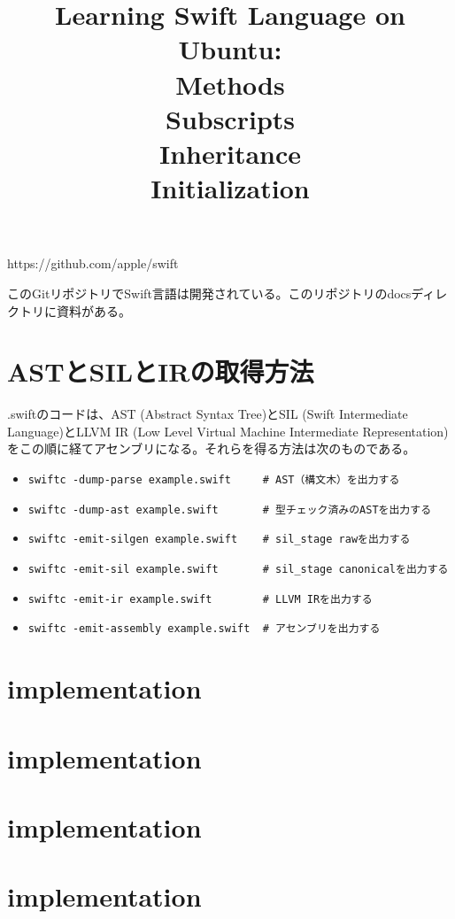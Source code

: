 \documentclass[uplatex,dvipdfmx]{jsarticle} \usepackage{amsmath,amssymb,bm}
\title{Learning Swift Language on Ubuntu:\\Methods\\Subscripts\\Inheritance\\Initialization} \author{} \date{}
\begin{document}
\maketitle


https://github.com/apple/swift

このGitリポジトリでSwift言語は開発されている。このリポジトリのdocsディレクトリに資料がある。

\section*{ASTとSILとIRの取得方法}
.swiftのコードは、AST (Abstract Syntax Tree)とSIL (Swift Intermediate Language)とLLVM IR (Low Level Virtual Machine Intermediate Representation)をこの順に経てアセンブリになる。それらを得る方法は次のものである。

\begin{itemize}
\item {\tt swiftc -dump-parse example.swift\ \ \ \ \ \# AST（構文木）を出力する}
\item {\tt swiftc -dump-ast example.swift\ \ \ \ \ \ \ \# 型チェック済みのASTを出力する}
\item {\tt swiftc -emit-silgen example.swift\ \ \ \ \# sil\_stage rawを出力する}
\item {\tt swiftc -emit-sil example.swift\ \ \ \ \ \ \ \# sil\_stage canonicalを出力する}
\item {\tt swiftc -emit-ir example.swift\ \ \ \ \ \ \ \ \# LLVM IRを出力する}
\item {\tt swiftc -emit-assembly example.swift\ \ \# アセンブリを出力する}
\end{itemize}




\section*{implementation}


\section*{implementation}


\section*{implementation}


\section*{implementation}








\vspace{\baselineskip}
\begin{paracol}{2}
\switchcolumn
\end{paracol}
\end{document}
